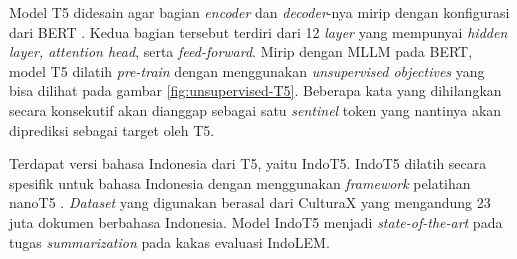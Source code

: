 Model T5 didesain agar bagian \textit{encoder} dan \textit{decoder}-nya mirip dengan konfigurasi dari BERT \parencite{T5}. Kedua bagian tersebut terdiri dari 12 \textit{layer} yang mempunyai \textit{hidden layer, attention head}, serta \textit{feed-forward}. Mirip dengan MLLM pada BERT, model T5 dilatih \textit{pre-train} dengan menggunakan \textit{unsupervised objectives} yang bisa dilihat pada gambar \ref{fig:unsupervised-T5}. Beberapa kata yang dihilangkan secara konsekutif akan dianggap sebagai satu \textit{sentinel} token yang nantinya akan diprediksi sebagai target oleh T5.

Terdapat versi bahasa Indonesia dari T5, yaitu IndoT5. IndoT5 dilatih secara spesifik untuk bahasa Indonesia dengan menggunakan \textit{framework} pelatihan nanoT5 \parencite{indoT5}. \textit{Dataset} yang digunakan berasal dari CulturaX yang mengandung 23 juta dokumen berbahasa Indonesia. Model IndoT5 menjadi \textit{state-of-the-art} pada tugas \textit{summarization} pada kakas evaluasi IndoLEM.
